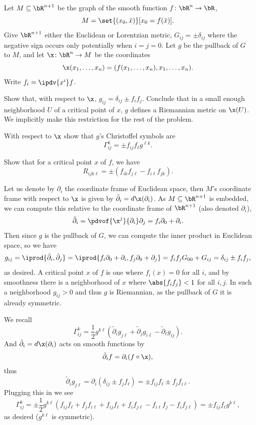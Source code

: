 \bprob

    Let $M\subseteq\bR^{n+1}$ be the graph of the smooth function $f\colon\bR^n\to\bR$,
    $$ M = \set{(x_0,\bar x)}[x_0=f(\bar x)] . $$
    Give $\bR^{n+1}$ either the Euclidean or Lorentzian metric, $G_{ij}=\pm\delta_{ij}$ where the negative sign occurs only potentially when $i=j=0$.
    Let $g$ be the pullback of $G$ to $M$, and let $\x\colon\bR^n\to M$ be the coordinates
    $$ \x(x_1,\dots,x_n) = (f(x_1,\dots,x_n),x_1,\dots,x_n) . $$
    Write $f_i=\ipdv{x^i}f$.
    \benum
        \item Show that, with respect to $\x$, $g_{ij}=\delta_{ij}\pm f_if_j$.
        Conclude that in a small enough neighborhood $U$ of a critical point of $x$, $g$ defines a Riemannian metric on $\x(U)$.
        We implicitly make this restriction for the rest of the problem.

        \item With respect to $\x$ show that $g$'s Christoffel symbols are
        $$ \Gamma^k_{ij} = \pm f_{ij}f_\ell g^{\ell k} . $$

        \item Show that for a critical point $x$ of $f$, we have
        $$ R_{ijk\ell} = \pm(f_{ik}f_{j\ell} - f_{i\ell}f_{jk}) . $$
    \eenum

\eprob

\benum
    \item Let us denote by $\partial_i$ the coordinate frame of Euclidean space, then $M$'s coordinate frame with respect to $\x$ is given by $\tilde\partial_i=d\x(\partial_i)$.
    As $M\subseteq\bR^{n+1}$ is embedded, we can compute this relative to the coordinate frame of $\bR^{n+1}$ (also denoted $\partial_i$),
    $$ \tilde\partial_i = \pdvof{\x^j}{\partial_i}\partial_j = f_i\partial_0 + \partial_i . $$
    Then since $g$ is the pullback of $G$, we can compute the inner product in Euclidean space, so we have
    $$ g_{ij} = \iprod{\tilde\partial_i,\tilde\partial_j} = \iprod{f_i\partial_0 + \partial_i, f_j\partial_0 + \partial_j} = f_if_jG_{00} + G_{ij} = \delta_{ij} \pm f_if_j , $$
    as desired.
    A critical point $x$ of $f$ is one where $f_i(x)=0$ for all $i$, and by smoothness there is a neighborhood of $x$ where $\abs{f_if_j}<1$ for all $i,j$.
    In such a neighborhood $g_{ij}>0$ and thus $g$ is Riemannian, as the pullback of $G$ it is already symmetric.

    \item We recall
    $$ \Gamma^k_{ij} = \frac12g^{k\ell}(\tilde\partial_ig_{j\ell} + \tilde\partial_jg_{i\ell} - \tilde\partial_\ell g_{ij}) . $$
    And $\tilde\partial_i=d\x(\partial_i)$ acts on smooth functions by
    $$ \tilde\partial_if = \partial_i(f\circ\x) , $$
    thus
    $$ \tilde\partial_ig_{j\ell} = \partial_i(\delta_{ij} \pm f_jf_\ell) = \pm f_{ij}f_\ell \pm f_jf_{i\ell} . $$
    Plugging this in we see
    $$ \Gamma^k_{ij} = \pm\frac12g^{k\ell}(f_{ij}f_\ell + f_jf_{i\ell} + f_{ij}f_\ell + f_if_{j\ell} - f_{i\ell}f_j - f_if_{j\ell}) = \pm f_{ij}f_\ell g^{k\ell} , $$
    as desired ($g^{k\ell}$ is symmetric).

